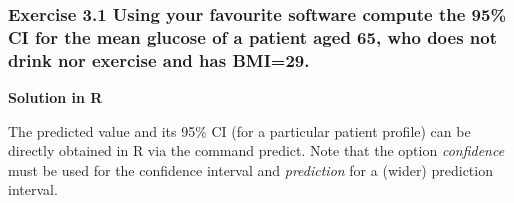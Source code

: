 \documentclass[
  letterpaper,
  DIV=11,
  numbers=noendperiod]{scrreprt}
\begin{document}
\subsubsection*{Exercise 3.1 Using your favourite software compute the
95\% CI for the mean glucose of a patient aged 65, who does not drink
nor exercise and has
BMI=29.}\label{exercise-3.1-using-your-favourite-software-compute-the-95-ci-for-the-mean-glucose-of-a-patient-aged-65-who-does-not-drink-nor-exercise-and-has-bmi29.}

\textbf{Solution in R}

The predicted value and its 95\% CI (for a particular patient profile)
can be directly obtained in R via the command predict. Note that the
option \emph{confidence} must be used for the confidence interval and
\emph{prediction} for a (wider) prediction interval.
\end{document}
